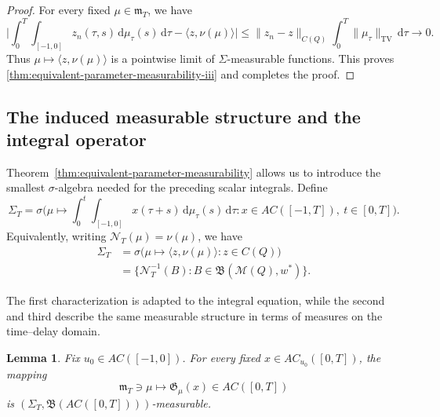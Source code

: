 \documentclass[reqno]{amsart}
\theoremstyle{plain}
\newtheorem{lemma}{Lemma}[section]
\numberwithin{equation}{section}
\numberwithin{definition}{section}
\newcommand{\dd}{\ensuremath{\mathrm{d}}}
\begin{document}
{\begin{proof}
For every fixed $\mu\in\mathfrak m_T$, we have
\begin{equation*}
    \Big|
            \int_0^T\int_{[-1,0]}
            z_n(\tau,s)\,\dd\mu_\tau(s)\,\dd\tau
            -
            \langle z,\nu(\mu)\rangle
        \Big|
        \le
        \|z_n-z\|_{C(Q)}
        \int_0^T\|\mu_\tau\|_{\mathrm{TV}}\,\dd\tau
        \to0.
\end{equation*}
Thus $\mu\mapsto\langle z,\nu(\mu)\rangle$ is a pointwise
limit of $\Sigma$-measurable functions.
This proves \ref{thm:equivalent-parameter-measurability-iii} and completes the proof.
\end{proof}

\subsection{The induced measurable structure and the integral operator}

Theorem~\ref{thm:equivalent-parameter-measurability}
allows us to introduce the smallest $\sigma$-algebra
needed for the preceding scalar integrals.
Define
\begin{equation*}
    \Sigma_T
    =
    \sigma\!\Big(
        \mu\mapsto
        \int_0^t\int_{[-1,0]}
        x(\tau+s)\,\dd\mu_\tau(s)\,\dd\tau:
        x\in AC([-1,T]),\
        t\in[0,T]
    \Big).
\end{equation*}
Equivalently, writing $\mathcal N_T(\mu)=\nu(\mu)$, we have
\begin{equation*}
    \begin{aligned}
        \Sigma_T
        &=
        \sigma\bigl(
            \mu\mapsto\langle z,\nu(\mu)\rangle:
            z\in C(Q)
        \bigr)\\
        &=
        \{
            \mathcal N_T^{-1}(B):
            B\in\mathfrak B(\mathcal M(Q),w^*)
        \}.
    \end{aligned}
\end{equation*}

The first characterization is adapted to the integral
equation, while the second and third describe the same
measurable structure in terms of measures on the
time--delay domain.

\begin{lemma}
    \label{cor:integral-operator-measurable}
Fix $u_0\in AC([-1,0])$.
For every fixed $x\in AC_{u_0}([0,T])$, the mapping
\begin{equation*}
    \mathfrak m_T\ni\mu
    \mapsto \mathfrak G_{\mu} (x)\in AC([0,T])
\end{equation*}
is $(\Sigma_T,\mathfrak B(AC([0,T])))$-measurable.
\end{lemma}

}
\end{document}
